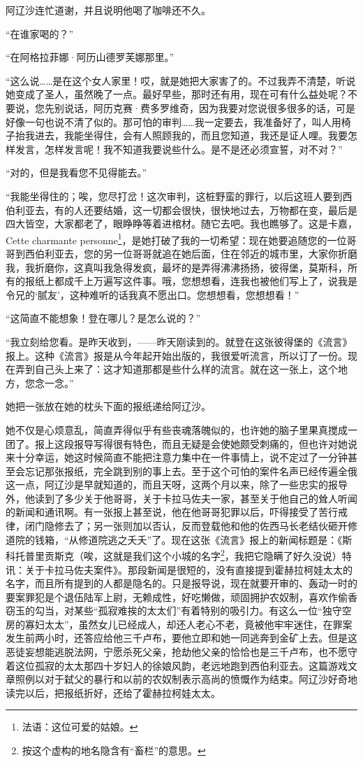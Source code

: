 \par 阿辽沙连忙道谢，并且说明他喝了咖啡还不久。
\par “在谁家喝的？”
\par “在阿格拉菲娜·阿历山德罗芙娜那里。”
\par “这么说……是在这个女人家里！哎，就是她把大家害了的。不过我弄不清楚，听说她变成了圣人，虽然晚了一点。最好早些，那时还有用，现在可有什么益处呢？不要说，您先别说话，阿历克赛·费多罗维奇，因为我要对您说很多很多的话，可是好像一句也说不清了似的。那可怕的审判……我一定要去，我准备好了，叫人用椅子抬我进去，我能坐得住，会有人照顾我的，而且您知道，我还是证人哩。我要怎样发言，怎样发言呢！我不知道我要说些什么。是不是还必须宣誓，对不对？”
\par “对的，但是我看您不见得能去。”
\par “我能坐得住的；唉，您尽打岔！这次审判，这桩野蛮的罪行，以后这班人要到西伯利亚去，有的人还要结婚，这一切都会很快，很快地过去，万物都在变，最后是四大皆空，大家都老了，眼睁睁等着进棺材。随它去吧。我也瞧够了。这是卡嘉，Cette charmante personne\footnote{法语：这位可爱的姑娘。}，是她打破了我的一切希望：现在她要追随您的一位哥哥到西伯利亚去，您的另一位哥哥就追在她后面，住在邻近的城市里，大家你折磨我，我折磨你，这真叫我急得发疯，最坏的是弄得沸沸扬扬，彼得堡，莫斯科，所有的报纸上都成千上万遍写这件事。哦，您想想看，连我也被他们写上了，说我是令兄的‘腻友’，这种难听的话我真不愿出口。您想想看，您想想看！”
\par “这简直不能想象！登在哪儿？是怎么说的？”
\par “我立刻给您看。是昨天收到，——昨天刚读到的。就登在这张彼得堡的《流言》报上。这种《流言》报是从今年起开始出版的，我很爱听流言，所以订了一份。现在弄到自己头上来了：这才知道那都是些什么样的流言。就在这一张上，这个地方，您念一念。”
\par 她把一张放在她的枕头下面的报纸递给阿辽沙。
\par 她不仅是心烦意乱，简直弄得似乎有些丧魂落魄似的，也许她的脑子里果真搅成一团了。报上这段报导写得很有特色，而且无疑是会使她颇受刺痛的，但也许对她说来十分幸运，她这时候简直不能把注意力集中在一件事情上，说不定过了一分钟甚至会忘记那张报纸，完全跳到别的事上去。至于这个可怕的案件名声已经传遍全俄这一点，阿辽沙是早就知道的，而且天呀，这两个月以来，除了一些忠实的报导外，他读到了多少关于他哥哥，关于卡拉马佐夫一家，甚至关于他自己的耸人听闻的新闻和通讯啊。有一张报上甚至说，他在他哥哥犯罪以后，吓得接受了苦行戒律，闭门隐修去了；另一张则加以否认，反而登载他和他的佐西马长老结伙砸开修道院的钱箱，“从修道院逃之夭夭”了。现在这张《流言》报上的新闻标题是：《斯科托普里贡斯克（唉，这就是我们这个小城的名字\footnote{按这个虚构的地名隐含有“畜栏”的意思。}，我把它隐瞒了好久没说）特讯：关于卡拉马佐夫案件》。那段新闻是很短的，没有直接提到霍赫拉柯娃太太的名字，而且所有提到的人都是隐名的。只是报导说，现在就要开审的、轰动一时的要案罪犯是个退伍陆军上尉，无赖成性，好吃懒做，顽固拥护农奴制，喜欢作偷香窃玉的勾当，对某些“孤寂难挨的太太们”有着特别的吸引力。有这么一位“独守空房的寡妇太太”，虽然女儿已经成人，却还人老心不老，竟被他牢牢迷住，在罪案发生前两小时，还答应给他三千卢布，要他立即和她一同逃奔到金矿上去。但是这恶徒妄想能逃脱法网，宁愿杀死父亲，抢劫他父亲的恰恰也是三千卢布，也不愿守着这位孤寂的太太那四十岁妇人的徐娘风韵，老远地跑到西伯利亚去。这篇游戏文章照例以对于弑父的暴行和以前的农奴制表示高尚的愤慨作为结束。阿辽沙好奇地读完以后，把报纸折好，还给了霍赫拉柯娃太太。
